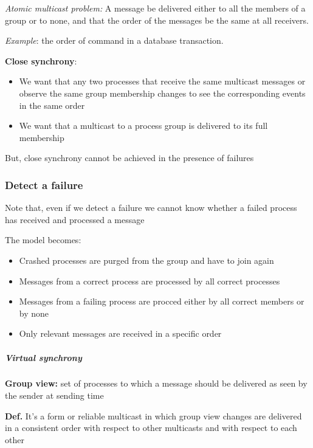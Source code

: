 \emph{Atomic multicast problem:} A message be delivered either to all
the members of a group or to none, and that the order of the messages be
the same at all receivers.

\emph{Example}: the order of command in a database transaction.

\textbf{Close synchrony}:

\begin{itemize}
\itemsep1pt\parskip0pt
\item
  We want that any two processes that receive the same multicast
  messages or observe the same group membership changes to see the
  corresponding events in the same order
\item
  We want that a multicast to a process group is delivered to its full
  membership
\end{itemize}

But, close synchrony cannot be achieved in the presence of failures

\subsubsection{Detect a failure}\label{detect-a-failure}

Note that, even if we detect a failure we cannot know whether a failed
process has received and processed a message

The model becomes:

\begin{itemize}
\itemsep1pt\parskip0pt
\item
  Crashed processes are purged from the group and have to join again
\item
  Messages from a correct process are processed by all correct processes
\item
  Messages from a failing process are procced either by all correct
  members or by none
\item
  Only relevant messages are received in a specific order
\end{itemize}

\subparagraph{Virtual synchrony}\label{virtual-synchrony}

\textbf{Group view:} set of processes to which a message should be
delivered as seen by the sender at sending time

\textbf{Def.} It's a form or reliable multicast in which group view
changes are delivered in a consistent order with respect to other
multicasts and with respect to each other

